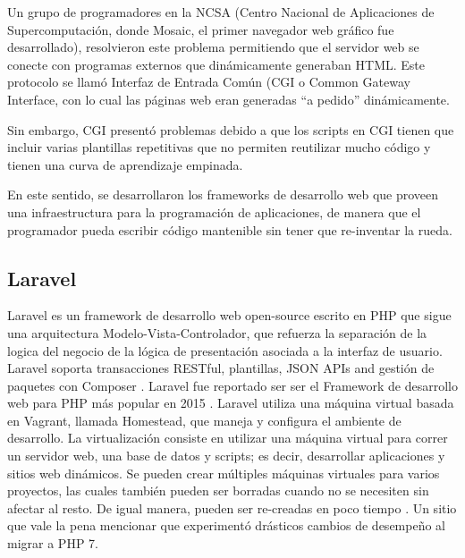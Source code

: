 Un grupo de programadores en la NCSA (Centro Nacional de Aplicaciones de Supercomputación, donde Mosaic, el primer navegador web gráfico fue desarrollado), resolvieron este problema permitiendo que el servidor web se conecte con programas externos que dinámicamente generaban HTML. Este protocolo se llamó Interfaz de Entrada Común (CGI o Common Gateway Interface, con lo cual las páginas web eran generadas “a pedido” dinámicamente. 

Sin embargo, CGI presentó problemas debido a que los scripts en CGI tienen que incluir varias plantillas repetitivas que no permiten reutilizar mucho código y tienen una curva de aprendizaje empinada.

En este sentido, se desarrollaron los frameworks de desarrollo web que proveen una infraestructura para la programación de aplicaciones, de manera que el programador pueda escribir código mantenible sin tener que re-inventar la rueda. \cite{Holovaty2016-nm}


\subsection{Laravel}
Laravel es un framework de desarrollo web open-source escrito en PHP que sigue una arquitectura Modelo-Vista-Controlador, que refuerza la separación de la logica del negocio de la lógica de presentación asociada a la interfaz de usuario. Laravel soporta transacciones RESTful, plantillas, JSON APIs and gestión de paquetes con Composer \cite{Bean2015-zt}.
Laravel fue reportado ser ser el Framework de desarrollo web para PHP más popular en 2015 \cite{SitePoint2015-yl}.
Laravel utiliza una máquina virtual basada en Vagrant, llamada Homestead, que maneja y configura el ambiente de desarrollo. La virtualización consiste en utilizar una máquina virtual para correr un servidor web, una base de datos y scripts; es decir, desarrollar aplicaciones y sitios web dinámicos. Se pueden crear múltiples máquinas virtuales para varios proyectos, las cuales también pueden ser borradas cuando no se necesiten sin afectar al resto.  De igual manera, pueden ser re-creadas en poco tiempo \cite{Wu2016-ws}. Un sitio que vale la pena mencionar que \cite{Tumblr2016-mn} experimentó drásticos cambios de desempeño al migrar a PHP 7. 


